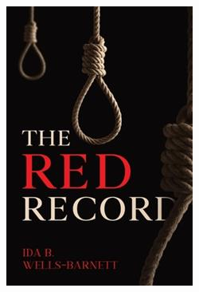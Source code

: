 \documentclass[
  letterpaper,
  DIV=11,
  numbers=noendperiod]{scrartcl}
\begin{document}
\begin{figure}
\begin{minipage}[t]{0.50\linewidth}
{{\includegraphics{ida2.jpg}

}

}

\end{minipage}%

\end{figure}
\end{document}
